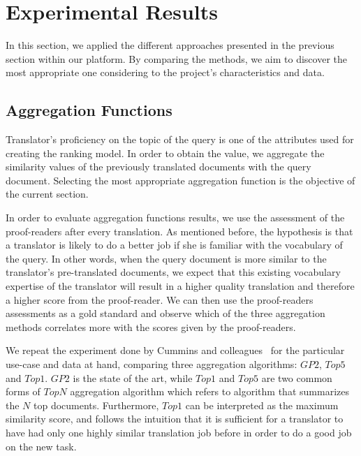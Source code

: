 \section{Experimental Results}
\label{sec:apply}
In this section, we applied the different approaches presented in the previous section within our platform. By comparing the methods, we aim to discover the most appropriate one considering to the project's characteristics and data. 

\subsection{Aggregation Functions}
Translator's proficiency on the topic of the query is one of the attributes used for creating the ranking model. In order to obtain the value, we aggregate the similarity values of the previously translated documents with the query document. Selecting the most appropriate aggregation function is the objective of the current section.

In order to evaluate aggregation functions results, we use the assessment of the proof-readers after every translation. As mentioned before, the hypothesis is that a translator is likely to do a better job if she is familiar with the vocabulary of the query. In other words, when the query document is more similar to the translator's pre-translated documents, we expect that this existing vocabulary expertise of the translator will result in a higher quality translation and therefore a higher score from the proof-reader. We can then use the proof-readers assessments as a gold standard and observe which of the three aggregation methods correlates more with the scores given by the proof-readers. 

We repeat the experiment done by Cummins and colleagues~\cite{agg-gp2} for the particular use-case and data at hand, comparing three aggregation algorithms: $GP2$, $Top5$ and $Top1$. $GP2$ is the state of the art, while $Top1$ and $Top5$ are two common forms of $TopN$ aggregation algorithm which refers to algorithm that summarizes the $N$ top documents. Furthermore, $Top1$ can be interpreted as the maximum similarity score, and follows the intuition that it is sufficient for a translator to have had only one highly similar translation job before in order to do a good job on the new task.

